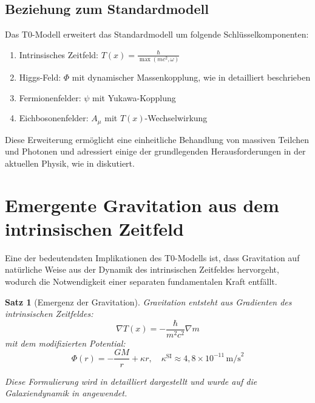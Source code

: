 \documentclass[12pt,a4paper]{article}
\newcommand{\Tfield}{T(x)}
\newtheorem{theorem}{Satz}[section]
\theoremstyle{definition}
\theoremstyle{remark}
\begin{document}
	\subsection{Beziehung zum Standardmodell}
	Das T0-Modell erweitert das Standardmodell um folgende Schlüsselkomponenten:
	\begin{enumerate}
		\item Intrinsisches Zeitfeld: \( \Tfield = \frac{\hbar}{\max(m c^2, \omega)} \)
		\item Higgs-Feld: \( \Phi \) mit dynamischer Massenkopplung, wie in \cite{pascher_higgs_2025} detailliert beschrieben
		\item Fermionenfelder: \( \psi \) mit Yukawa-Kopplung
		\item Eichbosonenfelder: \( A_\mu \) mit \( \Tfield \)-Wechselwirkung
	\end{enumerate}
	
	Diese Erweiterung ermöglicht eine einheitliche Behandlung von massiven Teilchen und Photonen und adressiert einige der grundlegenden Herausforderungen in der aktuellen Physik, wie in \cite{pascher_erweiterung_2025} diskutiert.
	
	\section{Emergente Gravitation aus dem intrinsischen Zeitfeld}
	Eine der bedeutendsten Implikationen des T0-Modells ist, dass Gravitation auf natürliche Weise aus der Dynamik des intrinsischen Zeitfeldes hervorgeht, wodurch die Notwendigkeit einer separaten fundamentalen Kraft entfällt.
	
	\begin{theorem}[Emergenz der Gravitation]
		Gravitation entsteht aus Gradienten des intrinsischen Zeitfeldes:
		\begin{equation}
			\nabla \Tfield = -\frac{\hbar}{m^2 c^2} \nabla m
		\end{equation}
		mit dem modifizierten Potential:
		\begin{equation}
			\Phi(r) = -\frac{GM}{r} + \kappa r, \quad \kappa^{\text{SI}} \approx 4,8 \times 10^{-11} \, \text{m/s}^2
		\end{equation}
		
		Diese Formulierung wird in \cite{pascher_emergente_gravitation_2025} detailliert dargestellt und wurde auf die Galaxiendynamik in \cite{pascher_galaxies_2025} angewendet.
	\end{theorem}
	
\end{document}

